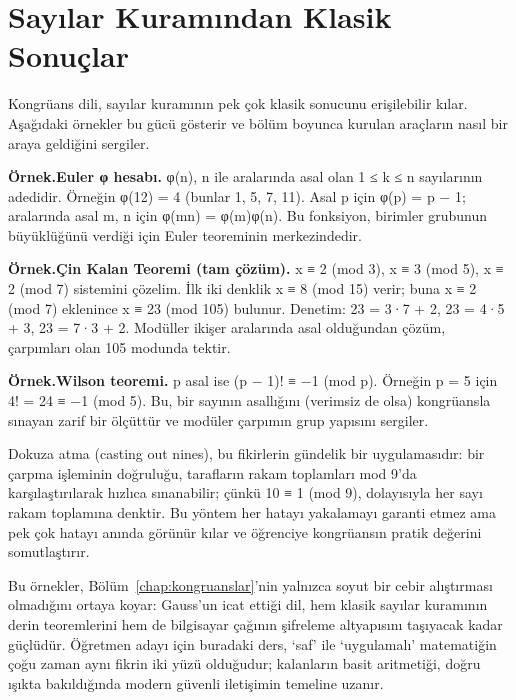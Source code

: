 \section{Sayılar Kuramından Klasik Sonuçlar}

Kongrüans dili, sayılar kuramının pek çok klasik sonucunu erişilebilir kılar. Aşağıdaki örnekler bu gücü gösterir ve bölüm boyunca kurulan araçların nasıl bir araya geldiğini sergiler.

\begin{tcolorbox}[bookbox,colback=cEx]\textbf{\textsf{\textcolor{cAcc}{Örnek.}}}\quad \textbf{Euler φ hesabı. }φ(n), n ile aralarında asal olan 1 ≤ k ≤ n sayılarının adedidir. Örneğin φ(12) = 4 (bunlar 1, 5, 7, 11). Asal p için φ(p) = p − 1; aralarında asal m, n için φ(mn) = φ(m)φ(n). Bu fonksiyon, birimler grubunun büyüklüğünü verdiği için Euler teoreminin merkezindedir.\end{tcolorbox}

\begin{tcolorbox}[bookbox,colback=cEx]\textbf{\textsf{\textcolor{cAcc}{Örnek.}}}\quad \textbf{Çin Kalan Teoremi (tam çözüm). }x ≡ 2 (mod 3), x ≡ 3 (mod 5), x ≡ 2 (mod 7) sistemini çözelim. İlk iki denklik x ≡ 8 (mod 15) verir; buna x ≡ 2 (mod 7) eklenince x ≡ 23 (mod 105) bulunur. Denetim: 23 = 3·7 + 2, 23 = 4·5 + 3, 23 = 7·3 + 2. Modüller ikişer aralarında asal olduğundan çözüm, çarpımları olan 105 modunda tektir.\end{tcolorbox}

\begin{tcolorbox}[bookbox,colback=cEx]\textbf{\textsf{\textcolor{cAcc}{Örnek.}}}\quad \textbf{Wilson teoremi. }p asal ise (p − 1)! ≡ −1 (mod p). Örneğin p = 5 için 4! = 24 ≡ −1 (mod 5). Bu, bir sayının asallığını (verimsiz de olsa) kongrüansla sınayan zarif bir ölçüttür ve modüler çarpımın grup yapısını sergiler.\end{tcolorbox}

Dokuza atma (casting out nines), bu fikirlerin gündelik bir uygulamasıdır: bir çarpma işleminin doğruluğu, tarafların rakam toplamları mod 9’da karşılaştırılarak hızlıca sınanabilir; çünkü 10 ≡ 1 (mod 9), dolayısıyla her sayı rakam toplamına denktir. Bu yöntem her hatayı yakalamayı garanti etmez ama pek çok hatayı anında görünür kılar ve öğrenciye kongrüansın pratik değerini somutlaştırır.

Bu örnekler, Bölüm~\ref{chap:kongruanslar}’nin yalnızca soyut bir cebir alıştırması olmadığını ortaya koyar: Gauss’un icat ettiği dil, hem klasik sayılar kuramının derin teoremlerini hem de bilgisayar çağının şifreleme altyapısını taşıyacak kadar güçlüdür. Öğretmen adayı için buradaki ders, ‘saf’ ile ‘uygulamalı’ matematiğin çoğu zaman aynı fikrin iki yüzü olduğudur; kalanların basit aritmetiği, doğru ışıkta bakıldığında modern güvenli iletişimin temeline uzanır.

